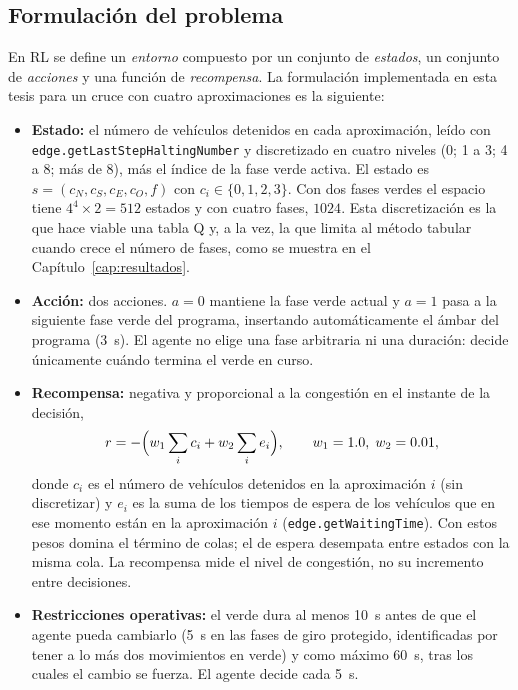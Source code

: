\subsection*{Formulación del problema}

En RL se define un \emph{entorno} compuesto por un conjunto de
\emph{estados}, un conjunto de \emph{acciones} y una función de
\emph{recompensa}. La formulación implementada en esta tesis para un
cruce con cuatro aproximaciones es la siguiente:

\begin{itemize}
  \item \textbf{Estado:} el número de vehículos detenidos en cada
    aproximación, leído con \verb|edge.getLastStepHaltingNumber| y
    discretizado en cuatro niveles (0; 1 a 3; 4 a 8; más de 8), más el
    índice de la fase verde activa. El estado es $s = (c_N, c_S, c_E,
    c_O, f)$ con $c_i \in \{0,1,2,3\}$. Con dos fases verdes el espacio
    tiene $4^4 \times 2 = 512$ estados y con cuatro fases, $1024$. Esta
    discretización es la que hace viable una tabla Q y, a la vez, la
    que limita al método tabular cuando crece el número de fases, como
    se muestra en el Capítulo~\ref{cap:resultados}.

  \item \textbf{Acción:} dos acciones. $a = 0$ mantiene la fase verde
    actual y $a = 1$ pasa a la siguiente fase verde del programa,
    insertando automáticamente el ámbar del programa (3~s). El agente
    no elige una fase arbitraria ni una duración: decide únicamente
    cuándo termina el verde en curso.

  \item \textbf{Recompensa:} negativa y proporcional a la congestión en
    el instante de la decisión,
    \begin{equation}
      r = -\Bigl(w_1 \sum_i c_i + w_2 \sum_i e_i\Bigr), \qquad
      w_1 = 1.0,\; w_2 = 0.01,
      \label{eq:recompensa}
    \end{equation}
    donde $c_i$ es el número de vehículos detenidos en la aproximación
    $i$ (sin discretizar) y $e_i$ es la suma de los tiempos de espera de
    los vehículos que en ese momento están en la aproximación $i$
    (\verb|edge.getWaitingTime|). Con estos pesos domina el término de
    colas; el de espera desempata entre estados con la misma cola. La
    recompensa mide el nivel de congestión, no su incremento entre
    decisiones.

  \item \textbf{Restricciones operativas:} el verde dura al menos 10~s
    antes de que el agente pueda cambiarlo (5~s en las fases de giro
    protegido, identificadas por tener a lo más dos movimientos en
    verde) y como máximo 60~s, tras los cuales el cambio se fuerza. El
    agente decide cada 5~s.
\end{itemize}

